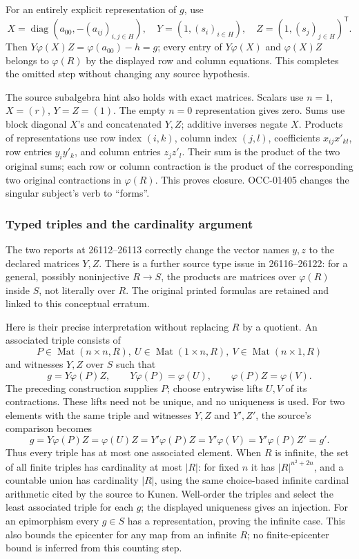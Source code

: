 For an entirely explicit representation of \(g\), use \[
X=\operatorname{diag}(a_{00},-(a_{ij})_{i,j\in H}),\quad
Y=(1,(s_i)_{i\in H}),\quad Z=(1,(s_j)_{j\in H})^{\mathsf T}.
\] Then \(Y\varphi(X)Z=\varphi(a_{00})-h=g\); every entry of \(Y\varphi(X)\) and \(\varphi(X)Z\) belongs to \(\varphi(R)\) by the displayed row and column equations. This completes the omitted step without changing any source hypothesis.

The source subalgebra hint also holds with exact matrices. Scalars use \(n=1\), \(X=(r)\), \(Y=Z=(1)\). The empty \(n=0\) representation gives zero. Sums use block diagonal \(X\)'s and concatenated \(Y,Z\); additive inverses negate \(X\). Products of representations use row index \((i,k)\), column index \((j,l)\), coefficients \(x_{ij}x'_{kl}\), row entries \(y_i y'_k\), and column entries \(z_j z'_l\). Their sum is the product of the two original sums; each row or column contraction is the product of the corresponding two original contractions in \(\varphi(R)\). This proves closure. OCC-01405 changes the singular subject's verb to ``forms''.

\subsubsection{Typed triples and the cardinality argument}\label{typed-triples-and-the-cardinality-argument}

The two reports at 26112--26113 correctly change the vector names \(y,z\) to the declared matrices \(Y,Z\). There is a further source type issue in 26116--26122: for a general, possibly noninjective \(R\to S\), the products are matrices over \(\varphi(R)\) inside \(S\), not literally over \(R\). The original printed formulas are retained and linked to this conceptual erratum.

Here is their precise interpretation without replacing \(R\) by a quotient. An associated triple consists of \[
P\in\operatorname{Mat}(n\times n,R),\
U\in\operatorname{Mat}(1\times n,R),\
V\in\operatorname{Mat}(n\times1,R)
\] and witnesses \(Y,Z\) over \(S\) such that \[
g=Y\varphi(P)Z,\qquad
Y\varphi(P)=\varphi(U),\qquad
\varphi(P)Z=\varphi(V).
\] The preceding construction supplies \(P\); choose entrywise lifts \(U,V\) of its contractions. These lifts need not be unique, and no uniqueness is used. For two elements with the same triple and witnesses \(Y,Z\) and \(Y',Z'\), the source's comparison becomes \[
g=Y\varphi(P)Z=\varphi(U)Z
=Y'\varphi(P)Z=Y'\varphi(V)
=Y'\varphi(P)Z'=g'.
\] Thus every triple has at most one associated element. When \(R\) is infinite, the set of all finite triples has cardinality at most \(|R|\): for fixed \(n\) it has \(|R|^{n^2+2n}\), and a countable union has cardinality \(|R|\), using the same choice-based infinite cardinal arithmetic cited by the source to Kunen. Well-order the triples and select the least associated triple for each \(g\); the displayed uniqueness gives an injection. For an epimorphism every \(g\in S\) has a representation, proving the infinite case. This also bounds the epicenter for any map from an infinite \(R\); no finite-epicenter bound is inferred from this counting step.

